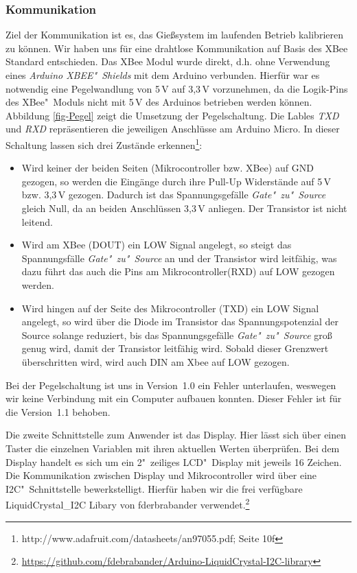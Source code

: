 \subsubsection{Kommunikation}
Ziel der Kommunikation ist es, das Gießsystem im laufenden Betrieb kalibrieren zu können. 
Wir haben uns für eine drahtlose Kommunikation auf Basis des XBee Standard entschieden. 
Das XBee Modul wurde direkt, d.h. ohne Verwendung eines \emph{Arduino XBEE"~Shields} mit dem Arduino verbunden. 
Hierfür war es notwendig eine Pegelwandlung von 5\,V auf 3,3\,V vorzunehmen, da die Logik-Pins des XBee"~Moduls nicht mit 5\,V des Arduinos betrieben werden können. 
Abbildung \ref{fig-Pegel} zeigt die Umsetzung der Pegelschaltung. Die Lables \emph{TXD} und \emph{RXD} repräsentieren die jeweiligen Anschlüsse am Arduino Micro. In dieser Schaltung lassen sich drei Zustände erkennen\footnote{http://www.adafruit.com/datasheets/an97055.pdf; Seite 10f}:
\begin{itemize}
\item Wird keiner der beiden Seiten (Mikrocontroller bzw. XBee) auf GND gezogen, so werden die Eingänge durch ihre Pull-Up 	Widerstände auf 5\,V bzw. 3,3\,V gezogen.
Dadurch ist das Spannungsgefälle \emph{Gate"~zu"~Source} gleich Null, da an beiden Anschlüssen 3,3\,V anliegen. Der Transistor ist nicht leitend.
\item Wird am XBee (DOUT) ein LOW Signal angelegt, so steigt das Spannungsfälle \emph{Gate"~zu"~Source} an und der Transistor wird leitfähig, was dazu führt das auch die Pins am Mikrocontroller(RXD) auf LOW gezogen werden.
\item Wird hingen auf der Seite des Mikrocontroller (TXD) ein LOW Signal angelegt, so wird über die Diode im Transistor das Spannungspotenzial der Source solange reduziert, bis das Spannungsgefälle \emph{Gate"~zu"~Source} groß genug wird, damit der Transistor leitfähig wird. Sobald dieser Grenzwert überschritten wird, wird auch DIN am Xbee auf LOW gezogen.
\end{itemize}

Bei der Pegelschaltung ist uns in Version~1.0 ein Fehler unterlaufen, weswegen wir keine Verbindung mit ein Computer aufbauen konnten. Dieser Fehler ist für die Version~1.1 behoben.





		
Die zweite Schnittstelle zum Anwender ist das Display. 
Hier lässt sich über einen Taster die einzelnen Variablen mit ihren aktuellen Werten überprüfen. 
Bei dem Display handelt es sich um ein 2"~zeiliges LCD"~Display mit jeweils 16 Zeichen. 
Die Kommunikation zwischen Display und Mikrocontroller wird über eine I2C"~Schnittstelle bewerkstelligt. 
Hierfür haben wir die frei verfügbare \mbox{LiquidCrystal\_I2C} Libary von fderbrabander verwendet.\footnote{\href{https://github.com/fdebrabander/Arduino-LiquidCrystal-I2C-library}{https://github.com/fdebrabander/Arduino-LiquidCrystal-I2C-library}}


